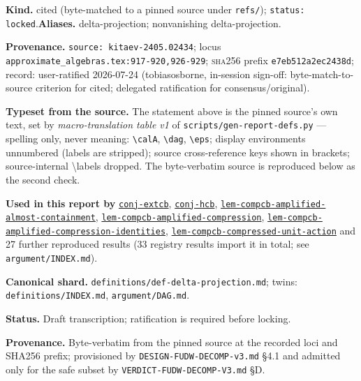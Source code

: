 \begin{defnote}
\textbf{Kind.} cited (byte-matched to a pinned source under \texttt{refs/}); \texttt{status: locked}.\quad\textbf{Aliases.} delta-projection; nonvanishing delta-projection.
\par
\textbf{Provenance.} \texttt{source: kitaev-\allowbreak{}2405.\allowbreak{}02434}; locus \texttt{approximate\_algebras.\allowbreak{}tex:\allowbreak{}917-\allowbreak{}920,\allowbreak{}926-\allowbreak{}929}; \textsc{sha256} prefix \texttt{e7eb512a2ec2438d}; record: user-\allowbreak{}ratified 2026-\allowbreak{}07-\allowbreak{}24 (tobiasosborne,\allowbreak{} in-\allowbreak{}session sign-\allowbreak{}off:\allowbreak{} byte-\allowbreak{}match-\allowbreak{}to-\allowbreak{}source criterion for cited;\allowbreak{} delegated ratification for consensus/\allowbreak{}original).
\par
\textbf{Typeset from the source.} The statement above is the pinned source's own text, set by \emph{macro-translation table v1} of \texttt{scripts/gen-report-defs.py} --- spelling only, never meaning: \texttt{\textbackslash{}calA}, \texttt{\textbackslash{}dag}, \texttt{\textbackslash{}eps}; display environments unnumbered (labels are stripped); source cross-reference keys shown in brackets; source-internal \textbackslash{}labels dropped. The byte-verbatim source is reproduced below as the second check.
\par
\textbf{Used in this report by} \hyperref[conj:extcb]{\texttt{conj-\allowbreak{}extcb}}, \hyperref[conj:hcb]{\texttt{conj-\allowbreak{}hcb}}, \hyperref[lem:compcb-amplified-almost-containment]{\texttt{lem-\allowbreak{}compcb-\allowbreak{}amplified-\allowbreak{}almost-\allowbreak{}containment}}, \hyperref[lem:compcb-amplified-compression]{\texttt{lem-\allowbreak{}compcb-\allowbreak{}amplified-\allowbreak{}compression}}, \hyperref[lem:compcb-amplified-compression-identities]{\texttt{lem-\allowbreak{}compcb-\allowbreak{}amplified-\allowbreak{}compression-\allowbreak{}identities}}, \hyperref[lem:compcb-compressed-unit-action]{\texttt{lem-\allowbreak{}compcb-\allowbreak{}compressed-\allowbreak{}unit-\allowbreak{}action}} and 27 further reproduced results (33 registry results import it in total; see \texttt{argument/INDEX.md}).
\par
\textbf{Canonical shard.} \texttt{definitions/\allowbreak{}def-\allowbreak{}delta-\allowbreak{}projection.\allowbreak{}md}; twins: \texttt{definitions/INDEX.md}, \texttt{argument/DAG.md}.
\par
\textbf{Status.} Draft transcription; ratification is required before locking.

\textbf{Provenance.} Byte-verbatim from the pinned source at the recorded loci
and SHA256 prefix; provisioned by \texttt{DESIGN-\allowbreak{}FUDW-\allowbreak{}DECOMP-\allowbreak{}v3.\allowbreak{}md} \S{}4.1 and admitted
only for the safe subset by \texttt{VERDICT-\allowbreak{}FUDW-\allowbreak{}DECOMP-\allowbreak{}V3.\allowbreak{}md} \S{}D.
\end{defnote}
